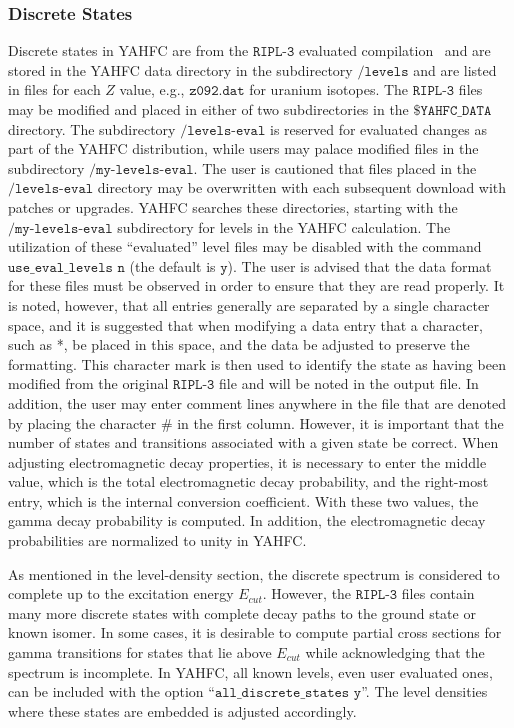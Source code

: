 \documentclass[
10pt,
showpacs,preprintnumbers,footinbib,
amsfonts,amsmath,amssymb,
aps,
prc,twocolumn,groupedaddress,superscriptaddress,
showkeys,
nofootinbib
]{revtex4-1}
\begin{document}
\subsubsection{Discrete States}

Discrete states in YAHFC are from the ${\texttt{RIPL-3}}$ evaluated compilation~\cite{Capote:2009,RIPL-3} and are stored in the YAHFC data directory in the subdirectory ${\texttt{/levels}}$ and are listed in files for each $Z$ value, e.g., ${\texttt{z092.dat}}$ for uranium isotopes. The ${\texttt{RIPL-3}}$ files may be modified and placed in either of two subdirectories in the ${\texttt{\$YAHFC\_DATA}}$ directory. The subdirectory ${\texttt{/levels-eval}}$ is reserved for evaluated changes as part of the YAHFC distribution, while users may palace modified files in the subdirectory ${\texttt{/my-levels-eval}}$. The user is cautioned that files placed in the ${\texttt{/levels-eval}}$ directory may be overwritten with each subsequent download with patches or upgrades. YAHFC searches these directories, starting with the ${\texttt{/my-levels-eval}}$ subdirectory for levels in the YAHFC calculation. The utilization of these ``evaluated'' level files may be disabled with the command ${\texttt{use\_eval\_levels n}}$ (the default is ${\texttt{y}}$). The user is advised that the data format for these files must be observed in order to ensure that they are read properly. It is noted, however, that all entries generally are separated by a single character space, and it is suggested that when modifying a data entry that a character, such as *, be placed in this space, and the data be adjusted to preserve the formatting. This character mark is then used to identify the state as having been modified from the original ${\texttt{RIPL-3}}$ file and will be noted in the output file. In addition, the user may enter comment lines anywhere in the file that are denoted by placing the character \# in the first column. However, it is important that the number of states and transitions associated with a given state be correct. When adjusting electromagnetic decay properties, it is necessary to enter the middle value, which is the total electromagnetic decay probability, and the right-most entry, which is the internal conversion coefficient. With these two values, the gamma decay probability is computed. In addition, the electromagnetic decay probabilities are normalized to unity in YAHFC.

As mentioned in the level-density section, the discrete spectrum is considered to complete up to the excitation energy $E_{cut}$. However, the ${\texttt{RIPL-3}}$ files contain many more discrete states with complete decay paths to the ground state or known isomer. In some cases, it is desirable to compute partial cross sections for gamma transitions for states that lie above $E_{cut}$ while acknowledging that the spectrum is incomplete. In YAHFC, all known levels, even user evaluated ones, can be included with the option ``${\texttt{all\_discrete\_states y}}$''. The level densities where these states are embedded is adjusted accordingly.
\end{document}
